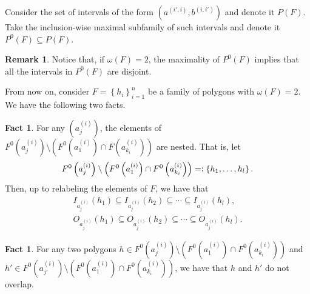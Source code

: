 \documentclass[12pt]{article}
\theoremstyle{definition}
\newtheorem{rmk}[thm]{Remark}
\newtheorem{fact}[thm]{Fact}
\newcommand{\eqdef}{=\vcentcolon}
\begin{document}
     Consider the set of intervals
     of the form $\left(a^{\left(i',i\right)},
     b^{\left(i,i'\right)}\right)$ 
     and denote it $P\left(F\right)$.
     Take the inclusion-wise maximal
     subfamily of such intervals
     and denote it $P^{0}\left(F\right)
     \subseteq P\left(F\right)$.
     
     \begin{rmk}
         Notice that, if 
         $\omega\left(F\right) = 2$,
         the maximality of
         $P^{0}\left(F\right)$ 
         implies that all the
         intervals in $P^{0}\left(F\right)$
         are disjoint.
     \end{rmk}

     From now on, consider
     $F = \left\{h_{i}\right\}_{i = 1}^{n}$ 
     be a family of polygons
     with $\omega\left(F\right)=2$.
     We have the following two facts.

     \begin{fact}
         For any $\left(a_{j}^{\left(i\right)}\right)$,
         the elements of
         $F^{0}\left(a_{j}^{\left(i\right)}\right)
         \setminus \left(
         F^{0}\left(a_{1}^{\left(i\right)}\right)
         \cap F\left(a_{k_{i}}^{\left(i\right)}\right)\right)$ 
         are nested. That is, let
         \begin{gather*}
             F^{0}\left(a_{j}^{\left(i\right)}\right) \setminus 
             \left(F^{0}\left(a_{1}^{\left(i\right)}\right) \cap 
             F^{0}\left(a_{k_{i}}^{\left(i\right)}\right)\right)
             \eqdef \left\{h_1, \ldots, h_{l}\right\}.
         \end{gather*}
         Then, up to relabeling
         the elements of $F$, we have that
         \begin{gather*}
             I_{a_{j}^{\left(i\right)}}\left(h_1\right)
             \subseteq I_{a_{j}^{\left(i\right)}}\left(h_2\right)
             \subseteq \cdots
             \subseteq I_{a_{j}^{\left(i\right)}}\left(h_{l}\right), \\
             O_{a_{j}^{\left(i\right)}}\left(h_1\right)
             \subseteq O_{a_{j}^{\left(i\right)}}\left(h_2\right)
             \subseteq \cdots
             \subseteq O_{a_{j}^{\left(i\right)}}\left(h_{l}\right).
         \end{gather*}
     \end{fact}
     
     \begin{fact}
         For any two polygons
         $h \in F^{0}\left(a_{j}^{\left(i\right)}\right) \setminus 
         \left(F^{0}\left(a_{1}^{\left(i\right)}\right) \cap 
         F^{0}\left(a_{k_{i}}^{\left(i\right)}\right)\right)$ 
         and 
         $h' \in F^{0}\left(a_{j'}^{\left(i\right)}\right) \setminus 
         \left(F^{0}\left(a_{1}^{\left(i\right)}\right) \cap 
         F^{0}\left(a_{k_{i}}^{\left(i\right)}\right)\right)$,
         we have that $h$ and $h'$
         do not overlap.    
     \end{fact}
\end{document}
